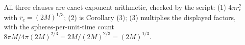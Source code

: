 All three clauses are exact exponent arithmetic, checked by the script: (1) $4\pi r_c^2$ with $r_c = (2M)^{1/3}$; (2) is Corollary (3); (3) multiplies the displayed factors, with the spheres-per-unit-time count $8\pi M / 4\pi(2M)^{2/3} = 2M/(2M)^{2/3} = (2M)^{1/3}$.
